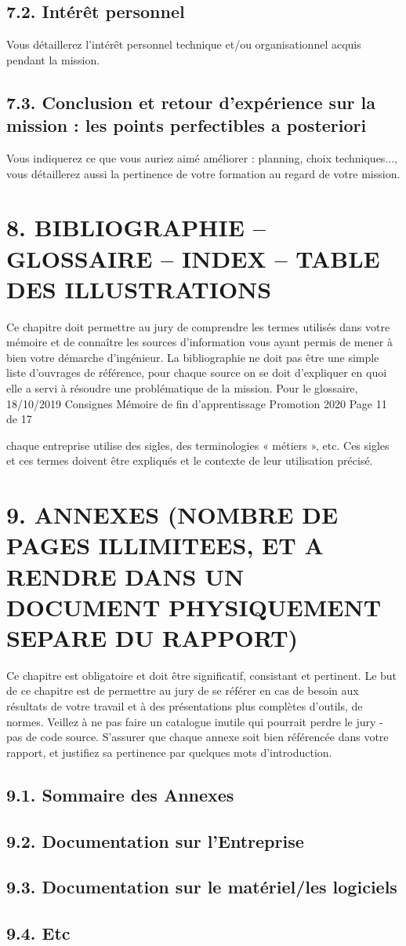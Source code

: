 \documentclass[a4paper, 12pt]{article}
\begin{document}
\subsection{7.2. Intérêt personnel}

Vous détaillerez l’intérêt personnel technique et/ou organisationnel acquis pendant la mission.

\subsection{7.3. Conclusion et retour d'expérience sur la mission : les points perfectibles a posteriori}

Vous indiquerez ce que vous auriez aimé améliorer : planning, choix techniques..., vous
détaillerez aussi la pertinence de votre formation au regard de votre mission.

\newpage{}
\section{8. BIBLIOGRAPHIE – GLOSSAIRE – INDEX – TABLE DES ILLUSTRATIONS}

Ce chapitre doit permettre au jury de comprendre les termes utilisés dans votre mémoire et de
connaître les sources d’information vous ayant permis de mener à bien votre démarche d’ingénieur.
La bibliographie ne doit pas être une simple liste d’ouvrages de référence, pour chaque source on se
doit d’expliquer en quoi elle a servi à résoudre une problématique de la mission. Pour le glossaire,
18/10/2019 Consignes Mémoire de fin d'apprentissage Promotion 2020 Page 11 de 17

chaque entreprise utilise des sigles, des terminologies « métiers », etc. Ces sigles et ces termes doivent
être expliqués et le contexte de leur utilisation précisé.

\newpage{}
\section{9. ANNEXES (NOMBRE DE PAGES ILLIMITEES, ET A RENDRE DANS UN DOCUMENT PHYSIQUEMENT SEPARE DU RAPPORT)}

Ce chapitre est obligatoire et doit être significatif, consistant et pertinent.
Le but de ce chapitre est de permettre au jury de se référer en cas de besoin aux résultats de votre
travail et à des présentations plus complètes d’outils, de normes. Veillez à ne pas faire un catalogue
inutile qui pourrait perdre le jury - pas de code source. S’assurer que chaque annexe soit bien
référencée dans votre rapport, et justifiez sa pertinence par quelques mots d’introduction.

\subsection{9.1. Sommaire des Annexes}

\subsection{9.2. Documentation sur l’Entreprise}

\subsection{9.3. Documentation sur le matériel/les logiciels}

\subsection{9.4. Etc}
\end{document}
